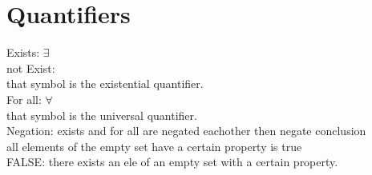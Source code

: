 \documentclass[12pt]{article}
\begin{document}
\section{Quantifiers}
	Exists: $ \exists $ \\
	not Exist: \nexists \\
	that symbol is the existential quantifier. \\
	For all: $ \forall $ \\
	that symbol is the universal quantifier. \\
	Negation: exists and for all are negated eachother then negate conclusion\\
	all elements of the empty set have a certain property is true \\
	FALSE: there exists an ele of an empty set with a certain property.
\end{document}
